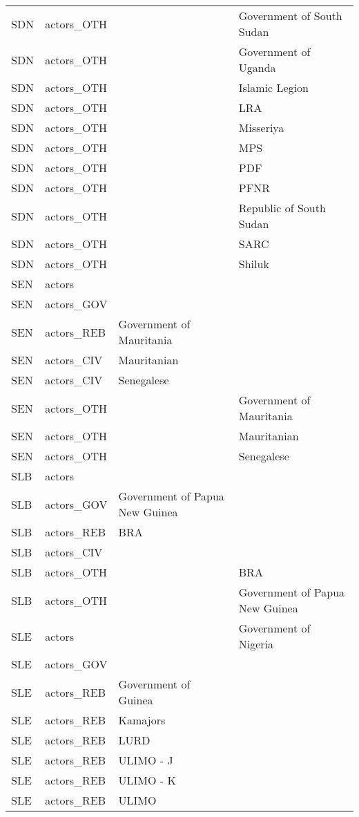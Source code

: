 \begin{table}[ht]
\begin{tabular}{llll}
  SDN & actors\_OTH &  & Government of South Sudan \\ 
  SDN & actors\_OTH &  & Government of Uganda \\ 
  SDN & actors\_OTH &  & Islamic Legion \\ 
  SDN & actors\_OTH &  & LRA \\ 
  SDN & actors\_OTH &  & Misseriya \\ 
  SDN & actors\_OTH &  & MPS \\ 
  SDN & actors\_OTH &  & PDF \\ 
  SDN & actors\_OTH &  & PFNR \\ 
  SDN & actors\_OTH &  & Republic of South Sudan \\ 
  SDN & actors\_OTH &  & SARC \\ 
  SDN & actors\_OTH &  & Shiluk \\ 
  SEN & actors &  &  \\ 
  SEN & actors\_GOV &  &  \\ 
  SEN & actors\_REB & Government of Mauritania &  \\ 
  SEN & actors\_CIV & Mauritanian &  \\ 
  SEN & actors\_CIV & Senegalese &  \\ 
  SEN & actors\_OTH &  & Government of Mauritania \\ 
  SEN & actors\_OTH &  & Mauritanian \\ 
  SEN & actors\_OTH &  & Senegalese \\ 
  SLB & actors &  &  \\ 
  SLB & actors\_GOV & Government of Papua New Guinea &  \\ 
  SLB & actors\_REB & BRA &  \\ 
  SLB & actors\_CIV &  &  \\ 
  SLB & actors\_OTH &  & BRA \\ 
  SLB & actors\_OTH &  & Government of Papua New Guinea \\ 
  SLE & actors &  & Government of Nigeria \\ 
  SLE & actors\_GOV &  &  \\ 
  SLE & actors\_REB & Government of Guinea &  \\ 
  SLE & actors\_REB & Kamajors &  \\ 
  SLE & actors\_REB & LURD &  \\ 
  SLE & actors\_REB & ULIMO - J &  \\ 
  SLE & actors\_REB & ULIMO - K &  \\ 
  SLE & actors\_REB & ULIMO &  \\ 

\end{tabular}
\end{table}
